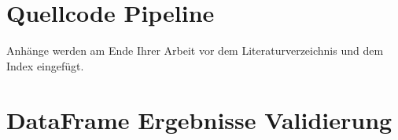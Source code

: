 \chapter{Quellcode Pipeline}
Anh\"ange werden am Ende Ihrer Arbeit vor dem Literaturverzeichnis und dem Index eingef\"ugt.

\chapter{DataFrame Ergebnisse Validierung}